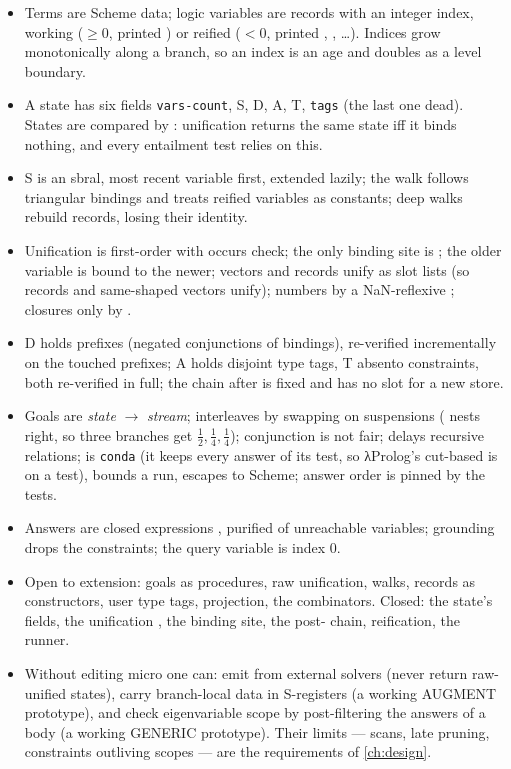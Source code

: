 \begin{itemize}
\item Terms are Scheme data; logic variables are records with an integer index, working ($\ge 0$,
  printed ) or reified ($<0$, printed , , \dots). Indices grow monotonically along a
  branch, so an index is an age and doubles as a level boundary.
\item A state has six fields \texttt{vars-count}, S, D, A, T, \texttt{tags} (the last one dead). States
  are compared by : unification returns the same state iff it binds nothing, and every
  entailment test relies on this.
\item S is an sbral, most recent variable first, extended lazily; the walk follows triangular bindings
  and treats reified variables as constants; deep walks rebuild records, losing their identity.
\item Unification is first-order with occurs check; the only binding site is
  ; the older variable is bound to the newer; vectors and records unify as
  slot lists (so records and same-shaped vectors unify); numbers by a NaN-reflexive ; closures
  only by .
\item D holds prefixes (negated conjunctions of bindings), re-verified incrementally on the touched
  prefixes; A holds disjoint type tags, T absento constraints, both re-verified in full; the chain after
   is fixed and has no slot for a new store.
\item Goals are \emph{state} $\to$ \emph{stream};  interleaves by swapping on suspensions
  ( nests right, so three branches get $\frac12,\frac14,\frac14$); conjunction is not fair;
   delays recursive relations;  is \texttt{conda} (it keeps every answer
  of its test, so λProlog's cut-based  is  on a  test),  bounds a run,
   escapes to Scheme; answer order is pinned by the tests.
\item Answers are closed expressions , purified of unreachable
  variables; grounding drops the constraints; the query variable is index 0.
\item Open to extension: goals as procedures, raw unification, walks, records as constructors, user
  type tags, projection, the combinators. Closed: the state's fields, the unification , the
  binding site, the post- chain, reification, the runner.
\item Without editing micro one can: emit  from external solvers (never return raw-unified
  states), carry branch-local data in S-registers (a working AUGMENT prototype), and check
  eigenvariable scope by post-filtering the answers of a  body (a working GENERIC prototype). Their
  limits — scans, late pruning, constraints outliving scopes — are the requirements of \cref{ch:design}.
\end{itemize}
